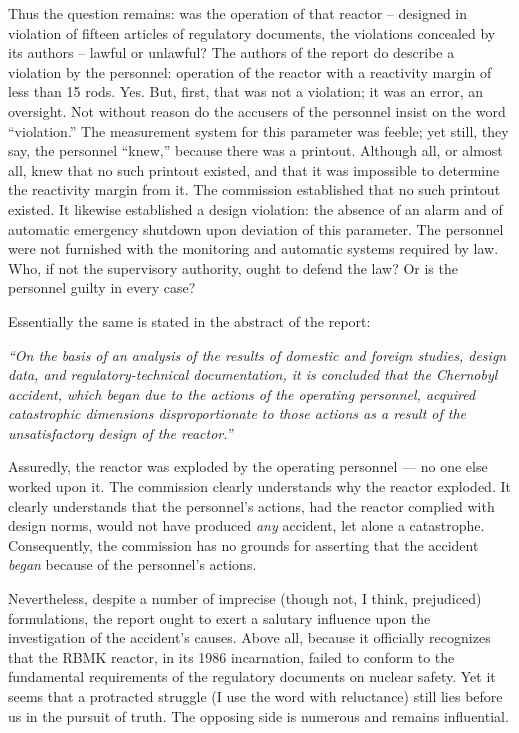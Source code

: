 \documentclass[openright]{bookest}
\begin{document}
Thus the question remains: was the operation of that reactor -- designed in violation of fifteen articles of regulatory documents, the violations concealed by its authors -- lawful or unlawful? The authors of the report do describe a violation by the personnel: operation of the reactor with a reactivity margin of less than \num{15} rods. Yes. But, first, that was not a violation; it was an error, an oversight. Not without reason do the accusers of the personnel insist on the word ``violation.'' The measurement system for this parameter was feeble; yet still, they say, the personnel ``knew,'' because there was a printout. Although all, or almost all, knew that no such printout existed, and that it was impossible to determine the reactivity margin from it. The commission established that no such printout existed. It likewise established a design violation: the absence of an alarm and of automatic emergency shutdown upon deviation of this parameter. The personnel were not furnished with the monitoring and automatic systems required by law. Who, if not the supervisory authority, ought to defend the law? Or is the personnel guilty in every case?

Essentially the same is stated in the abstract of the report:

\begin{personal}
\textit{``On the basis of an analysis of the results of domestic and foreign studies, design data, and regulatory-technical documentation, it is concluded that the Chernobyl accident, which began due to the actions of the operating personnel, acquired catastrophic dimensions disproportionate to those actions as a result of the unsatisfactory design of the reactor.''}
\end{personal}

Assuredly, the reactor was exploded by the operating personnel --- no one else worked upon it. The commission clearly understands why the reactor exploded. It clearly understands that the personnel's actions, had the reactor complied with design norms, would not have produced \textit{any} accident, let alone a catastrophe. Consequently, the commission has no grounds for asserting that the accident \textit{began} because of the personnel's actions.

Nevertheless, despite a number of imprecise (though not, I think, prejudiced) formulations, the report ought to exert a salutary influence upon the investigation of the accident's causes. Above all, because it officially recognizes that the RBMK reactor, in its 1986 incarnation, failed to conform to the fundamental requirements of the regulatory documents on nuclear safety. Yet it seems that a protracted struggle (I use the word with reluctance) still lies before us in the pursuit of truth. The opposing side is numerous and remains influential.
\end{document}
